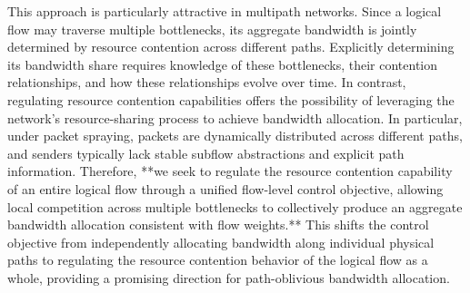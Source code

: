 This approach is particularly attractive in multipath networks. Since a logical flow may traverse multiple bottlenecks, its aggregate bandwidth is jointly determined by resource contention across different paths. Explicitly determining its bandwidth share requires knowledge of these bottlenecks, their contention relationships, and how these relationships evolve over time. In contrast, regulating resource contention capabilities offers the possibility of leveraging the network's resource-sharing process to achieve bandwidth allocation. In particular, under packet spraying, packets are dynamically distributed across different paths, and senders typically lack stable subflow abstractions and explicit path information. Therefore, **we seek to regulate the resource contention capability of an entire logical flow through a unified flow-level control objective, allowing local competition across multiple bottlenecks to collectively produce an aggregate bandwidth allocation consistent with flow weights.** This shifts the control objective from independently allocating bandwidth along individual physical paths to regulating the resource contention behavior of the logical flow as a whole, providing a promising direction for path-oblivious bandwidth allocation.


